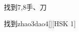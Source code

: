 \begin{entry}{找到}{7,8}{⼿、⼑}
  \begin{phonetics}{找到}{zhao3dao4}[][HSK 1]
  \end{phonetics}
\end{entry}
